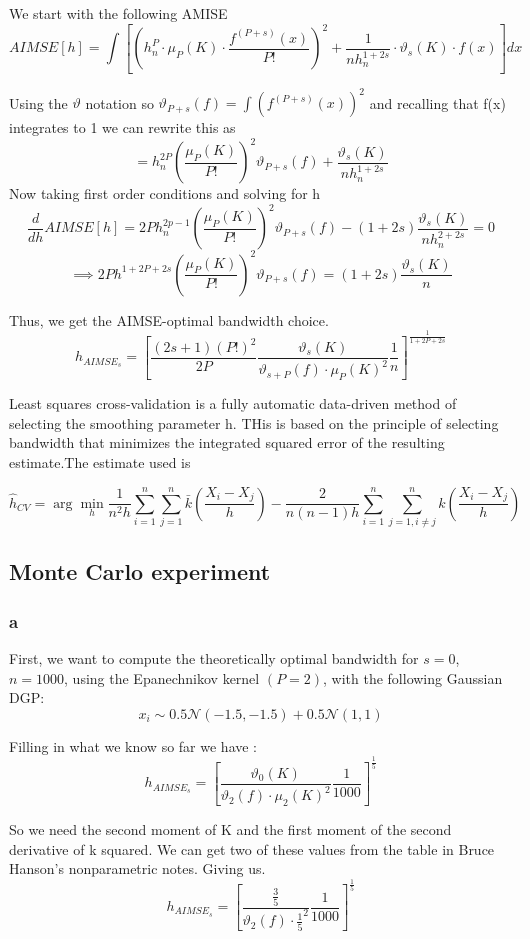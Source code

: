 \documentclass[11pt]{article}
\newcommand{\N}{\mathcal{N}}
\begin{document}
We start with the following AMISE
$$ AIMSE[h] = \int \left[ \left( h_n^P \cdot \mu_P(K) \cdot \frac{f^{(P+s)}(x)}{P!}   \right)^2 + \frac{1}{nh_n^{1+2s}} \cdot \vartheta_s(K) \cdot f(x) \right]dx
$$

Using the $\vartheta$ notation so $\vartheta_{P+s}(f) = \int(f^{(P+s)}(x))^2$ and recalling that f(x) integrates to 1 we can rewrite this as 
$$ =  h_n^{2P} \left( \frac{\mu_P(K)}{P!} \right)^2 \vartheta_{P+s}(f) + \frac{\vartheta_s(K)}{nh_n^{1+2s}}
$$
Now taking first order conditions and solving for h 
$$ \frac{d}{dh}AIMSE[h] =  2Ph_n^{2p-1} \left( \frac{\mu_P(K)}{P!} \right)^2 \vartheta_{P+s}(f) -(1+2s) \frac{\vartheta_s(K)}{nh_n^{2+2s}} =0
$$
$$ \implies 2Ph^{1+2P+2s}\left( \frac{\mu_P(K)}{P!} \right)^2 \vartheta_{P+s}(f) = (1+2s) \frac{\vartheta_s(K)}{n}
$$

Thus, we get the AIMSE-optimal bandwidth choice.
$$h_{AIMSE_s} = \left[ \frac{(2s+1)(P!)^2}{2P} \frac{\vartheta_s(K)}{\vartheta_{s+P}(f) \cdot \mu_P(K)^2} \frac{1}{n} \right]^{\frac{1}{1+2P+2s}}$$

Least squares cross-validation is a fully automatic data-driven method of selecting the smoothing parameter h. THis is based on the principle of selecting bandwidth that minimizes the integrated squared error of the resulting estimate.The estimate used is 

$$ \hat{h}_{CV} = \arg \min_{h} \frac{1}{n^2h} \sum_{i=1}^n \sum_{j=1}^n \bar{k} \left(\frac{X_i - X_j}{h}\right) - \frac{2}{n(n-1)h}\sum_{i=1}^n\sum_{j=1, i\neq j}^nk\left(\frac{X_i - X_j}{h}\right)
$$


\subsection{Monte Carlo experiment}

\subsubsection{a} First, we want to compute the theoretically optimal bandwidth for $s=0$, $n=1000$, using the Epanechnikov kernel $(P=2)$, with the following Gaussian DGP:
$$x_i \sim 0.5 \N(-1.5,-1.5) + 0.5\N(1,1)$$

Filling in what we know so far we have : 
$$h_{AIMSE_s} = \left[ \frac{\vartheta_0(K)}{\vartheta_{2}(f) \cdot \mu_2(K)^2} \frac{1}{1000} \right]^{\frac{1}{5}}$$

So we need the second moment of K and the first moment of the second derivative of k squared. We can get two of these values from the table in Bruce Hanson's nonparametric notes. Giving us. 
$$h_{AIMSE_s} = \left[ \frac{\frac{3}{5}}{\vartheta_{2}(f) \cdot \frac{1}{5}^2} \frac{1}{1000} \right]^{\frac{1}{5}}$$
\end{document}
